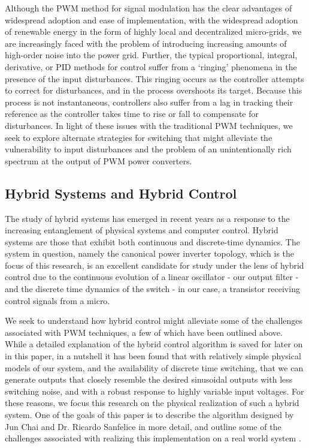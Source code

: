 Although the PWM method for signal modulation has the clear advantages of widespread adoption and ease of implementation, with the widespread adoption of renewable energy in the form of highly local and decentralized micro-grids, we are increasingly faced with the problem of introducing increasing amounts of high-order noise into the power grid. Further, the typical proportional, integral, derivative, or PID methods for control suffer from a `ringing' phenomena in the presence of the input disturbances. This ringing occurs as the controller attempts to correct for disturbances, and in the process overshoots its target. Because this process is not instantaneous, controllers also suffer from a lag in tracking their reference as the controller takes time to rise or fall to compensate for disturbances. In light of these issues with the traditional PWM techniques, we seek to explore alternate strategies for switching that might alleviate the vulnerability to input disturbances and the problem of an unintentionally rich spectrum at the output of PWM power converters. 

\subsection{Hybrid Systems and Hybrid Control}
\label{hybridApproach}
The study of hybrid systems has emerged in recent years as a response to the increasing entanglement of physical systems and computer control. 
Hybrid systems are those that exhibit both continuous and discrete-time dynamics. The system in question, namely the canonical power inverter topology, which is the focus of this research, is an excellent candidate for study under the lens of hybrid control due to the continuous evolution of a linear oscillator - our output filter - and the discrete time dynamics of the switch - in our case, a transistor receiving control signals from a micro. 

We seek to understand how hybrid control might alleviate some of the challenges associated with PWM techniques, a few of which have been outlined above. While a detailed explanation of the hybrid control algorithm is saved for later on in this paper, in a nutshell it has been found that with relatively simple physical models of our system, and the availability of discrete time switching, that we can generate outputs that closely resemble the desired sinusoidal outputs with less switching noise, and with a robust response to highly variable input voltages. For these reasons, we focus this research on the physical realization of such a hybrid system. One of the goals of this paper is to describe the algorithm designed by Jun Chai and Dr. Ricardo Sanfelice in more detail, and outline some of the challenges associated with realizing this implementation on a real world system \cite{ricardo}.

